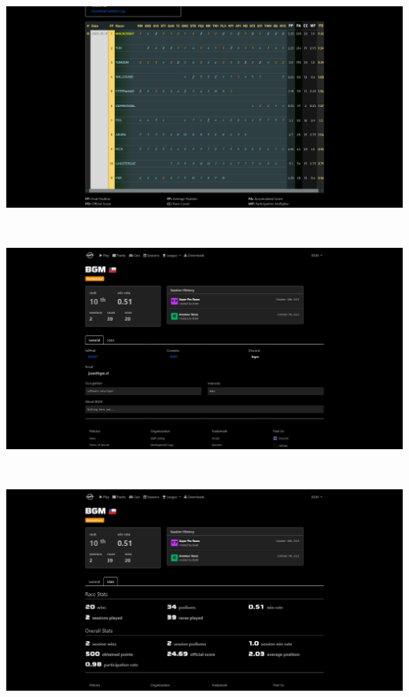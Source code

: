 \includegraphics[width=15cm, height=8cm]{img/session2.png} \\

\includegraphics[width=15cm, height=8cm]{img/profile.png} \\

\includegraphics[width=15cm, height=8cm]{img/profile1.png} \\

